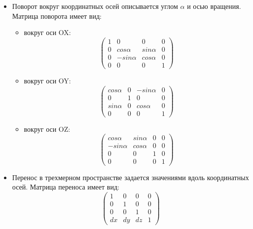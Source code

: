 \begin{itemize}
	\item Поворот вокруг координатных осей описывается углом $\alpha$ и осью вращения.
	Матрица поворота имеет вид:
	\begin{itemize}
		\item вокруг оси OX:
		\begin{equation}
			\begin{pmatrix}
				1 	& 0 		  & 0 	       & 0 \\
				0 	& cos \alpha  & sin \alpha & 0 \\
				0	& -sin \alpha & cos \alpha & 0 \\
				0 	& 0 		  & 0          & 1
			\end{pmatrix}
		\end{equation}
		\item вокруг оси OY:
			\begin{equation}
			\begin{pmatrix}
				cos \alpha 	& 0 & -sin \alpha & 0 \\
				0 			& 1 & 0 		  & 0 \\
				sin \alpha	& 0 & cos \alpha  & 0 \\
				0 			& 0 & 0           & 1
			\end{pmatrix}
		\end{equation}
		\item вокруг оси OZ:
		\begin{equation}
			\begin{pmatrix}
				cos \alpha 	 & sin \alpha & 0 & 0 \\
				-sin \alpha  & cos \alpha & 0 & 0 \\
				0	 		 & 0		  & 1 & 0 \\
				0 			 & 0 		  & 0 & 1
			\end{pmatrix}
		\end{equation}
	\end{itemize}
	\item Перенос в трехмерном пространстве задается значениями вдоль координатных осей.
	Матрица переноса имеет вид:
	\begin{equation}
		\begin{pmatrix}
			1  & 0  & 0  & 0 \\
			0  & 1  & 0  & 0 \\
			0  & 0  & 1  & 0 \\
			dx & dy	& dz & 1
		\end{pmatrix}
	\end{equation}
\end{itemize}

